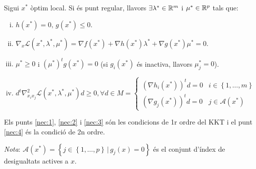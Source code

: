 \begin{prop}
    Sigui $x^*$ \`optim local. Si \'es punt regular, llavors $\exists \lambda^* \in \mathbb{R}^m$ i $\mu^* \in \mathbb{R}^p$ tals que:
    \begin{enumerate}[i)]
        \item \label{nec:1} $h\left( x^* \right) = 0,\, g\left( x^* \right) \leq 0$.
        \item \label{nec:2} $\nabla_x \mathcal{L}\left( x^*, \lambda^*, \mu^* \right) = \nabla f\left( x^* \right) + \nabla h\left( x^* \right) \lambda^* + \nabla g\left( x^* \right)\mu^* = 0$.
        \item \label{nec:3} $\mu^* \geq 0$ i $\left( \mu^* \right)^t g\left( x^* \right) = 0$ (si $g_i\left( x^* \right)$ \'es inactiva, llavors $\mu_j^* = 0$).
        \item \label{nec:4} $d^t \nabla_{x_ix_j}^2 \mathcal{L} \left( x^*, \lambda^*, \mu^* \right) d \geq 0, \forall d\in M =
            \begin{cases}
                \left( \nabla h_i\left( x^* \right) \right)^t d = 0 & i \in \left\{1,\dots,m\right\} \\
                \left( \nabla g_j\left( x^* \right) \right)^t d = 0 & j \in \mathcal{A}\left( x^* \right)
            \end{cases}$ \\
    \end{enumerate}
    Els punts \ref{nec:1}, \ref{nec:2} i \ref{nec:3} s\'on les condicions de 1r ordre del KKT i el punt \ref{nec:4} \'es la condici\'o de 2n ordre.
    \begin{adjustwidth}{1cm}{}
    {\it Nota}: $\mathcal{A}\left( x^* \right) = \left\{ j \in \left\{ 1, \dots, p \right\} \, |\, g_j \left( x \right) = 0\right\}$ \'es el conjunt d'\'index de desigualtats actives a $x$.
    \end{adjustwidth}
\end{prop}
